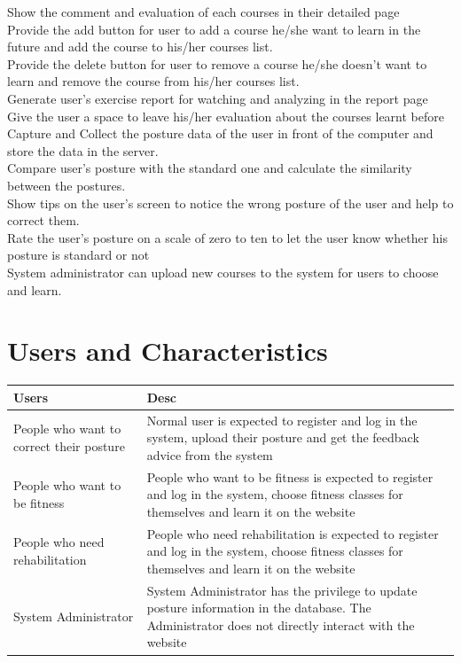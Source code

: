 \documentclass[16pt]{scrreprt}
\begin{document}
 
Show the comment and evaluation of each courses in their detailed page\\

 
Provide the add button for user to add a course he/she want to learn in the future and add the course to his/her courses list.\\

 
Provide the delete button for user to remove a course he/she doesn't want to learn and remove the course from his/her courses list.\\


Generate user's exercise report for watching and analyzing in the report page\\
 
Give the user a space to leave his/her evaluation about the courses learnt before\\

Capture and Collect the posture data of the user in front of the computer and store the data in the server.\\


Compare user's posture with the standard one and calculate the similarity between the postures.\\


Show tips on the user's screen to notice the wrong posture of the user and help to correct them.\\


Rate the user's posture on a scale of zero to ten to let the user know whether his posture is standard or not\\


System administrator can upload new courses to the system for users to choose and learn.\\

\section{Users and Characteristics}

 
\begin{center}
    \begin{tabular}{p{5cm}p{11cm}}
        \hline
        Users & Desc\\
        \hline
        People who want to correct their posture &  Normal user is expected to register and log in the system, upload their posture and get the feedback advice from the system\\
        \hline
        People who want to be fitness & People who want to be fitness is expected to register and log in the system, choose fitness classes for themselves and learn it on the website\\
        \hline
        People who need rehabilitation & People who need rehabilitation is expected to register and log in the system, choose fitness classes for themselves and learn it on the website\\
        \hline
        System Administrator & System Administrator has the privilege to update posture information in the database. The Administrator does not directly interact with the website\\
        \hline
    \end{tabular}
\end{center}
\end{document}
